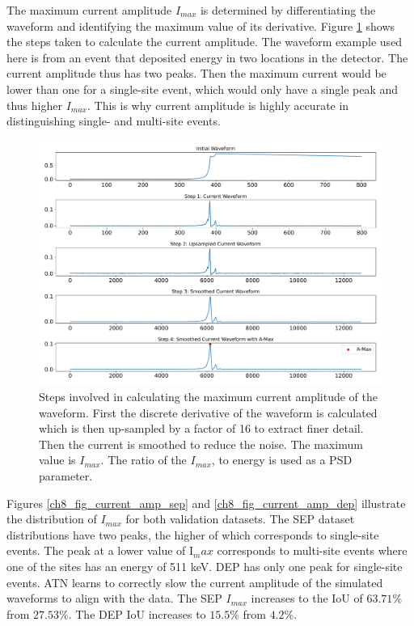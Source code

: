 The maximum current amplitude $I_{max}$ is determined by differentiating the waveform and identifying the maximum value of its derivative. Figure \ref{fig_ch8_curr_amp_calc} shows the steps taken to calculate the current amplitude. The waveform example used here is from an event that deposited energy in two locations in the detector. The current amplitude thus has two peaks. Then the maximum current would be lower than one for a single-site event, which would only have a single peak and thus higher $I_{max}$. This is why current amplitude is highly accurate in distinguishing single- and multi-site events.


\begin{figure}%
    \centering
    \includegraphics[width=0.99\linewidth, trim={0.4cm 0pc 0.3cm 0pc},clip]{ch8/figs/curr_amp_calc.pdf}
    \caption{Steps involved in calculating the maximum current amplitude of the waveform. First the discrete derivative of the waveform is calculated which is then up-sampled by a factor of 16 to extract finer detail. Then the current is smoothed to reduce the noise. The maximum value is $I_{max}$. The ratio of the $I_{max}$, to energy is used as a PSD parameter.}
    \label{fig_ch8_curr_amp_calc}
\end{figure}

Figures \ref{ch8_fig_current_amp_sep} and \ref{ch8_fig_current_amp_dep} illustrate the distribution of $I_{max}$ for both validation datasets. The SEP dataset distributions have two peaks, the higher of which corresponds to single-site events. The peak at a lower value of I$_max$ corresponds to multi-site events where one of the sites has an energy of 511 keV. DEP has only one peak for single-site events. ATN learns to correctly slow the current amplitude of the simulated waveforms to align with the data. The SEP $I_{max}$ increases to the IoU of $63.71\%$ from $27.53\%$. The DEP IoU increases to $15.5\%$ from $4.2\%$. 
  
